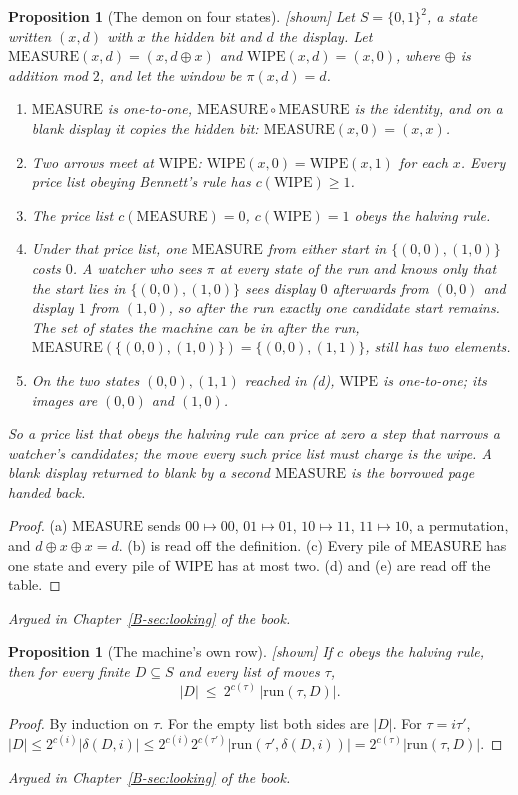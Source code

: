 \documentclass[11pt, a4paper]{article}
\theoremstyle{plain}
\newtheorem{proposition}[theorem]{Proposition}
\theoremstyle{definition}
\theoremstyle{remark}
\newcommand{\step}{\delta}
\newcommand{\cost}{c}
\newcommand{\run}{\mathrm{run}}
\newcommand{\argued}[1]{\par\noindent\textit{Argued in Chapter~\ref{B-#1} of the book.}\par}
\newcommand{\kind}[1]{\textup{[#1]}}
\begin{document}
\begin{proposition}[The demon on four states]\label{spec:demon} \kind{shown}
Let $S=\{0,1\}^2$, a state written $(x,d)$ with $x$ the hidden bit and $d$ the display. Let
$\mathrm{MEASURE}(x,d)=(x,d\oplus x)$ and $\mathrm{WIPE}(x,d)=(x,0)$, where $\oplus$ is addition mod $2$, and
let the window be $\pi(x,d)=d$.
\begin{enumerate}[label=(\alph*)]
\item $\mathrm{MEASURE}$ is one-to-one, $\mathrm{MEASURE}\circ\mathrm{MEASURE}$ is the identity, and on a blank
display it copies the hidden bit: $\mathrm{MEASURE}(x,0)=(x,x)$.
\item Two arrows meet at $\mathrm{WIPE}$: $\mathrm{WIPE}(x,0)=\mathrm{WIPE}(x,1)$ for each $x$. Every price list
obeying Bennett's rule has $\cost(\mathrm{WIPE})\ge 1$.
\item The price list $\cost(\mathrm{MEASURE})=0$, $\cost(\mathrm{WIPE})=1$ obeys the halving rule.
\item Under that price list, one $\mathrm{MEASURE}$ from either start in $\{(0,0),(1,0)\}$ costs $0$. A
watcher who sees $\pi$ at every state of the run and knows only that the start lies in $\{(0,0),(1,0)\}$
sees display $0$ afterwards from $(0,0)$ and display $1$ from $(1,0)$, so after the run exactly one
candidate start remains. The set of states the machine can be in after the run,
$\mathrm{MEASURE}(\{(0,0),(1,0)\})=\{(0,0),(1,1)\}$, still has two elements.
\item On the two states $(0,0),(1,1)$ reached in (d), $\mathrm{WIPE}$ is one-to-one; its images are $(0,0)$
and $(1,0)$.
\end{enumerate}
So a price list that obeys the halving rule can price at zero a step that narrows a watcher's candidates;
the move every such price list must charge is the wipe. A blank display returned to blank by a second
$\mathrm{MEASURE}$ is the borrowed page handed back.
\end{proposition}
\begin{proof}
(a) $\mathrm{MEASURE}$ sends $00\mapsto00$, $01\mapsto01$, $10\mapsto11$, $11\mapsto10$, a permutation, and
$d\oplus x\oplus x=d$. (b) is read off the definition. (c) Every pile of $\mathrm{MEASURE}$ has one state and
every pile of $\mathrm{WIPE}$ has at most two. (d) and (e) are read off the table.
\end{proof}
\argued{sec:looking}

\begin{proposition}[The machine's own row]\label{spec:row-shrinks} \kind{shown}
If $\cost$ obeys the halving rule, then for every finite $D\subseteq S$ and every list of moves $\tau$,
\[
|D|\ \le\ 2^{\cost(\tau)}\,|\run(\tau,D)|.
\]
\end{proposition}
\begin{proof}
By induction on $\tau$. For the empty list both sides are $|D|$. For $\tau=i\tau'$,
$|D|\le 2^{\cost(i)}|\step(D,i)|\le 2^{\cost(i)}2^{\cost(\tau')}|\run(\tau',\step(D,i))|
=2^{\cost(\tau)}|\run(\tau,D)|$.
\end{proof}
\argued{sec:looking}
\end{document}
